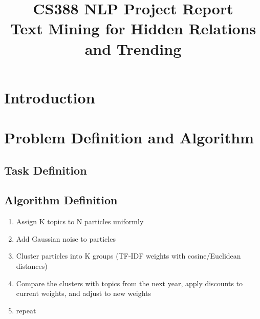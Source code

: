 \documentclass[conference]{IEEEtran}
\begin{document}
\title{\large{CS388 NLP Project Report}\\ \huge{Text Mining for Hidden Relations and Trending}}

\author{
\and
{}
}
\maketitle

\begin{abstract}

\end{abstract}

\section{Introduction}

\section{Problem Definition and Algorithm}


\subsection{Task Definition}


\subsection{Algorithm Definition}
\begin{enumerate}
    \item Assign K topics to N particles uniformly
    \item Add Gaussian noise to particles
    \item Cluster particles into K groups (TF-IDF weights with cosine/Euclidean distances)
    \item Compare the clusters with topics from the next year, apply discounts to current weights, and adjust to new weights
    \item repeat
\end{enumerate}
\end{document}
